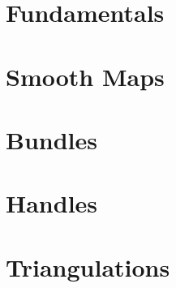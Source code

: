 

\section{Fundamentals}


\section{Smooth Maps}


\section{Bundles}


\section{Handles}


\section{Triangulations}



%
